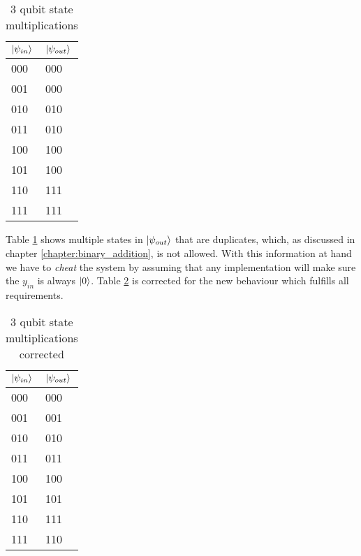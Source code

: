 \begin{table}[!h]
\centering
\begin{tabular}{|l|l|}
\hline
$\ket{\psi_{in}}$ & $\ket{\psi_{out}}$ \\ \hline
000               & 000                \\ \hline
001               & 000                \\ \hline
010               & 010                \\ \hline
011               & 010                \\ \hline
100               & 100                \\ \hline
101               & 100                \\ \hline
110               & 111                \\ \hline
111               & 111                \\ \hline
\end{tabular}
\caption{3 qubit state multiplications}
\label{table:three_qubit_state_multiplications}
\end{table}

Table \ref{table:three_qubit_state_multiplications} shows multiple states in $\ket{\psi_{out}}$ that are duplicates, which, as discussed in chapter \ref{chapter:binary_addition}, is not allowed. With this information at hand we have to \emph{cheat} the system by assuming that any implementation will make sure the $y_{in}$ is always $\ket{0}$. Table \ref{table:three_qubit_state_multiplications_corrected} is corrected for the new behaviour which fulfills all requirements.

\begin{table}[!h]
\centering
\begin{tabular}{|l|l|}
\hline
$\ket{\psi_{in}}$ & $\ket{\psi_{out}}$ \\ \hline
000               & 000                \\ \hline
001               & 001                \\ \hline
010               & 010                \\ \hline
011               & 011                \\ \hline
100               & 100                \\ \hline
101               & 101                \\ \hline
110               & 111                \\ \hline
111               & 110                \\ \hline
\end{tabular}
\caption{3 qubit state multiplications corrected}
\label{table:three_qubit_state_multiplications_corrected}
\end{table}

